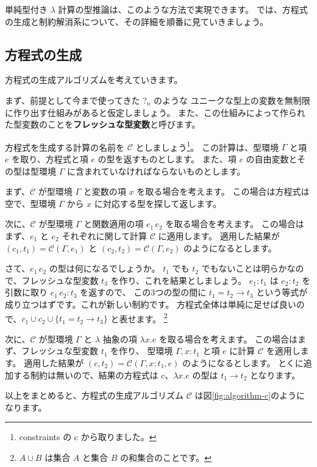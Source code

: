 単純型付き $\lambda$ 計算の型推論は、このような方法で実現できます。
では、方程式の生成と制約解消系について、その詳細を順番に見ていきましょう。

\subsection{方程式の生成}

方程式の生成アルゴリズムを考えていきます。

まず、前提として今まで使ってきた $?_n$ のような
ユニークな型上の変数を無制限に作り出す仕組みがあると仮定しましょう。
また、この仕組みによって作られた型変数のことを\textbf{フレッシュな型変数}と呼びます。

方程式を生成する計算の名前を $\mathcal C$ としましょう\footnote{constraints の c から取りました。}。
この計算は、型環境 $\Gamma$ と項 $e$ を取り、方程式と項 $e$ の型を返すものとします。
また、項 $e$ の自由変数とその型は型環境 $\Gamma$ に含まれていなければならないものとします。

まず、$\mathcal C$ が型環境 $\Gamma$ と変数の項 $x$ を取る場合を考えます。
この場合は方程式は空で、型環境 $\Gamma$ から $x$ に対応する型を探して返します。

次に、$\mathcal C$ が型環境 $\Gamma$ と関数適用の項 $e_1 \, e_2$ を取る場合を考えます。
この場合はまず、$e_1$ と $e_2$ それぞれに関して計算 $\mathcal C$ に適用します。
適用した結果が $(c_1, t_1) = \mathcal{C}(\Gamma, e_1)$ と $(c_2, t_2) = \mathcal{C}(\Gamma, e_2)$
のようになるとします。

さて、$e_1 \, e_2$ の型は何になるでしょうか。
$t_1$ でも $t_2$ でもないことは明らかなので、フレッシュな型変数 $t_3$ を作り、これを結果としましょう。
$e_1 : t_1$ は $e_2 : t_2$ を引数に取り $e_1 \, e_2 : t_3$ を返すので、
この3つの型の間に $t_1 = t_2 \to t_3$ という等式が成り立つはずです。これが新しい制約です。
方程式全体は単純に足せば良いので、$c_1 \cup c_2 \cup \{t_1 = t_2 \to t_3\}$ と表せます。
\footnote{$A \cup B$ は集合 $A$ と集合 $B$ の和集合のことです。}

次に、$\mathcal C$ が型環境 $\Gamma$ と $\lambda$ 抽象の項 $\lambda x . e$ を取る場合を考えます。
この場合はまず、フレッシュな型変数 $t_1$ を作り、
型環境 $\Gamma, x : t_1$ と項 $e$ に計算 $\mathcal C$ を適用します。
適用した結果が $(c, t_2) = \mathcal{C}(\Gamma, x : t_1, e)$ のようになるとします。
とくに追加する制約は無いので、結果の方程式は $c$、$\lambda x . e$ の型は $t_1 \to t_2$ となります。

以上をまとめると、方程式の生成アルゴリズム $\mathcal C$ は図\ref{fig:algorithm-c}のようになります。

